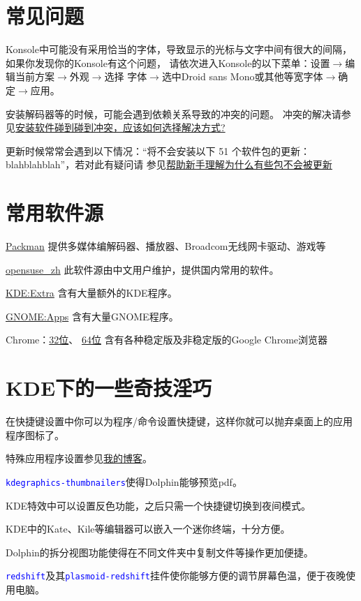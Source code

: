 \documentclass[10pt,openany]{book}
\newcommand{\soft}[1]{\texttt{\textcolor{blue}{#1}}}
\begin{document}
\section{常见问题}
Konsole中可能没有采用恰当的字体，导致显示的光标与文字中间有很大的间隔，如果你发现你的Konsole有这个问题，
请依次进入Konsole的以下菜单：设置$\rightarrow$编辑当前方案$\rightarrow$外观$\rightarrow$选择
字体$\rightarrow$选中Droid sans Mono或其他等宽字体$\rightarrow$确定$\rightarrow$应用。

安装解码器等的时候，可能会遇到依赖关系导致的冲突的问题。
冲突的解决请参见\href{https://forum.suse.org.cn/viewtopic.php?t=2867&p=22491#p22491}{安装软件碰到碰到冲突，应该如何选择解决方式?}

更新时候常常会遇到以下情况：“将不会安装以下 51 个软件包的更新：blahblahblah”，若对此有疑问请
参见\href{https://forum.suse.org.cn/viewtopic.php?t=2777&p=21896}{帮助新手理解为什么有些包不会被更新}
\section{常用软件源}\label{repo}


\begin{compactdesc}
 \item[\href{http://mirrors.hust.edu.cn/packman/suse/openSUSE_13.1/}{Packman}]
 提供多媒体编解码器、播放器、Broadcom无线网卡驱动、游戏等
 \item[\href{http://download.opensuse.org/repositories/home:/opensuse_zh/openSUSE_13.1/}{opensuse\_zh}]
 此软件源由中文用户维护，提供国内常用的软件。
 \item[\href{http://download.opensuse.org/repositories/KDE:/Extra/openSUSE_13.1/}{KDE:Extra}]
 含有大量额外的KDE程序。
 \item[\href{http://download.opensuse.org/repositories/GNOME:/Apps/openSUSE_13.1/}{GNOME:Apps}]
 含有大量GNOME程序。
 \item[Chrome：\href{http://dl.google.com/linux/chrome/rpm/stable/i386}{32位}、 \href{http://dl.google.com/linux/chrome/rpm/stable/x86_64}{64位}] 含有各种稳定版及非稳定版的Google Chrome浏览器
\end{compactdesc}
\section{KDE下的一些奇技淫巧}
在快捷键设置中你可以为程序/命令设置快捷键，这样你就可以抛弃桌面上的应用程序图标了。

特殊应用程序设置参见\href{https://zpj.blog.ustc.edu.cn/?p=304}{我的博客}。

\soft{kdegraphics-thumbnailers}使得Dolphin能够预览pdf。

KDE特效中可以设置反色功能，之后只需一个快捷键切换到夜间模式。

KDE中的Kate、Kile等编辑器可以嵌入一个迷你终端，十分方便。

Dolphin的拆分视图功能使得在不同文件夹中复制文件等操作更加便捷。

\soft{redshift}及其\soft{plasmoid-redshift}挂件使你能够方便的调节屏幕色温，便于夜晚使用电脑。
\end{document}
